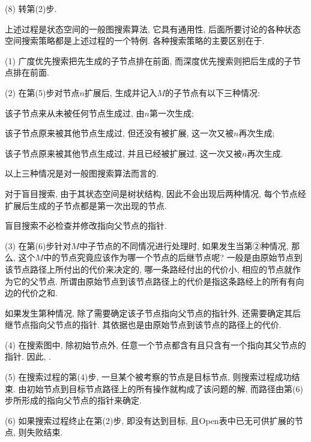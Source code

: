 \quad (8) 转第(2)步.
\begin{remark}
    上述过程是状态空间的一般图搜索算法, 它具有通用性, 后面所要讨论的各种状态空间搜索策略都是上述过程的一个特例. 各种搜索策略的主要区别在于.
\end{remark}

\begin{remark}

(1) 广度优先搜索把先生成的子节点排在前面, 而深度优先搜索则把后生成的子节点排在前面.

(2) 在第(5)步对节点$n$扩展后, 生成并记入$M$的子节点有以下三种情况:

    \quad {} 该子节点来从未被任何节点生成过, 由$n$第一次生成;

    \quad {} 该子节点原来被其他节点生成过, 但还没有被扩展, 这一次又被$n$再次生成;

    \quad {} 该子节点原来被其他节点生成过, 并且已经被扩展过, 这一次又被$n$再次生成.

以上三种情况是对一般图搜索算法而言的.

对于盲目搜索, 由于其状态空间是树状结构, 因此不会出现后两种情况, 每个节点经扩展后生成的子节点都是第一次出现的节点.

\begin{tcolorbox}
    盲目搜索不必检查并修改指向父节点的指针.
\end{tcolorbox}

(3) 在第(6)步针对$M$中子节点的不同情况进行处理时, 如果发生当第②种情况, 那么, 这个$M$中的节点究竟应该作为哪一个节点的后继节点呢?
一般是由原始节点到该节点路径上所付出的代价来决定的, 哪一条路经付出的代价小, 相应的节点就作为它的父节点. 所谓由原始节点到该节点路径上的代价是指这条路经上的所有有向边的代价之和.

如果发生第种情况, 除了需要确定该子节点指向父节点的指针外, 还需要确定其后继节点指向父节点的指针. 其依据也是由原始节点到该节点的路径上的代价.

(4) 在搜索图中, 除初始节点外, 任意一个节点都含有且只含有一个指向其父节点的指针. 因此, .

(5) 在搜索过程的第(4)步, 一旦某个被考察的节点是目标节点, 则搜索过程成功结束. 由初始节点到目标节点路径上的所有操作就构成了该问题的解, 而路径由第(6)步所形成的指向父节点的指针来确定.

(6) 如果搜索过程终止在第(2)步, 即没有达到目标, 且\textup{Open}表中已无可供扩展的节点, 则失败结束.
\end{remark}
